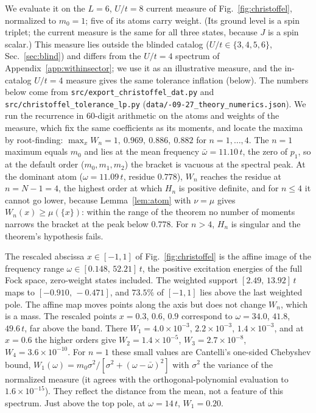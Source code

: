 \documentclass[submission, PhysCore]{SciPost}
\begin{document}
\begin{appendix}
We evaluate it on the $L=6$, $U/t=8$ current measure of Fig.~\ref{fig:christoffel}, normalized to $m_0=1$; five of its atoms carry weight. (Its ground level is a spin triplet; the current measure is the same for all three states, because $J$ is a spin scalar.) This measure lies outside the blinded catalog ($U/t\in\{3,4,5,6\}$, Sec.~\ref{sec:blind}) and differs from the $U/t=4$ spectrum of Appendix~\ref{app:withinsector}; we use it as an illustrative measure, and the in-catalog $U/t=4$ measure gives the same tolerance inflation (below). The numbers below come from \texttt{src/\allowbreak export\_christoffel\_dat.py} and \texttt{src/\allowbreak christoffel\_tolerance\_lp.py} (\texttt{data/-09-27\_theory\_numerics.json}). We run the recurrence in $60$-digit arithmetic on the atoms and weights of the measure, which fix the same coefficients as its moments, and locate the maxima by root-finding: $\max_xW_n=1,\ 0.969,\ 0.886,\ 0.882$ for $n=1,\dots,4$. The $n=1$ maximum equals $m_0$ and lies at the mean frequency $\bar\omega=11.10\,t$, the zero of $p_1$, so at the default order ($m_0,m_1,m_2$) the bracket is vacuous at the spectral peak. At the dominant atom ($\omega=11.09\,t$, residue $0.778$), $W_n$ reaches the residue at $n=N-1=4$, the highest order at which $H_n$ is positive definite, and for $n\le4$ it cannot go lower, because Lemma~\ref{lem:atom} with $\nu=\mu$ gives $W_n(x)\ge\mu(\{x\})$: within the range of the theorem no number of moments narrows the bracket at the peak below $0.778$. For $n>4$, $H_n$ is singular and the theorem's hypothesis fails.

The rescaled abscissa $x\in[-1,1]$ of Fig.~\ref{fig:christoffel} is the affine image of the frequency range $\omega\in[0.148,\,52.21]\,t$, the positive excitation energies of the full Fock space, zero-weight states included. The weighted support $[2.49,\,13.92]\,t$ maps to $[-0.910,\,-0.471]$, and $73.5\%$ of $[-1,1]$ lies above the last weighted pole. The affine map moves points along the axis but does not change $W_n$, which is a mass. The rescaled points $x=0.3$, $0.6$, $0.9$ correspond to $\omega=34.0$, $41.8$, $49.6\,t$, far above the band. There $W_1=4.0\times10^{-3}$, $2.2\times10^{-3}$, $1.4\times10^{-3}$, and at $x=0.6$ the higher orders give $W_2=1.4\times10^{-5}$, $W_3=2.7\times10^{-8}$, $W_4=3.6\times10^{-10}$. For $n=1$ these small values are Cantelli's one-sided Chebyshev bound, $W_1(\omega)=m_0\sigma^2/[\sigma^2+(\omega-\bar\omega)^2]$ with $\sigma^2$ the variance of the normalized measure (it agrees with the orthogonal-polynomial evaluation to $1.6\times10^{-15}$). They reflect the distance from the mean, not a feature of this spectrum. Just above the top pole, at $\omega=14\,t$, $W_1=0.20$.


\end{appendix}
\end{document}
